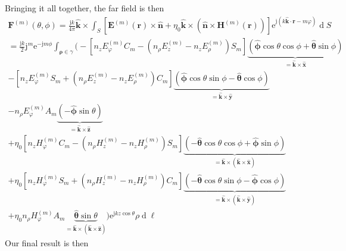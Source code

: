 \documentclass[a4paper,12pt]{article}
\renewcommand{\vec}[1]{\boldsymbol{#1}}
\newcommand{\unitvec}[1]{\hat{\vec{#1}}}
\newcommand{\mrm}[1]{\mathrm{#1}}
\newcommand{\diff}{\operatorname{d}\!}
\newcommand{\ju}{\mrm{j}}
\newcommand{\eu}{\mrm{e}}
\newcommand{\Ev}{\vec{E}}
\newcommand{\Hv}{\vec{H}}
\newcommand{\Fv}{\vec{F}}
\newcommand{\rv}{\vec{r}}
\newcommand{\xuv}{\unitvec{x}}
\newcommand{\yuv}{\unitvec{y}}
\newcommand{\zuv}{\unitvec{z}}
\newcommand{\nuv}{\unitvec{n}}
\newcommand{\kuv}{\unitvec{k}}
\newcommand{\thetauv}{\unitvec{\theta}}
\newcommand{\phiuv}{\unitvec{\phi}}
\begin{document}
Bringing it all together, the far field is then 
\begin{multline}
  \Fv^{(m)}(\theta,\phi) = \frac{\ju k}{4\pi} \kuv\times \int_{S} \left[ \Ev^{(m)}(\rv)\times\nuv + \eta_{0}\kuv\times(\nuv\times\Hv^{(m)}(\rv)) \right] \eu^{\ju(k\kuv\cdot\rv-m\varphi)} \diff S \\
  = \frac{\ju k}{2} \ju^{m}\eu^{-\ju m\phi} \int_{\vec{\rho}\in\gamma}
  \Big( - \left[ n_{z}E_{\varphi}^{(m)}C_{m}
    - (n_{\rho}E_{z}^{(m)} - n_{z}E_{\rho}^{(m)})S_{m} \right] \underbrace{(\phiuv\cos\theta\cos\phi + \thetauv\sin\phi)}_{=\kuv\times\xuv} \\
  - \left[ n_{z}E_{\varphi}^{(m)}S_{m}
    + (n_{\rho}E_{z}^{(m)} - n_{z}E_{\rho}^{(m)}) C_{m} \right] \underbrace{(\phiuv\cos\theta\sin\phi - \thetauv\cos\phi)}_{=\kuv\times\yuv} \\
  - n_{\rho}E_{\varphi}^{(m)}A_{m} \underbrace{(-\phiuv\sin\theta)}_{=\kuv\times\zuv} \\
  + \eta_{0} \left[ n_{z}H_{\varphi}^{(m)}C_{m}
    - (n_{\rho}H_{z}^{(m)} - n_{z}H_{\rho}^{(m)})S_{m} \right] \underbrace{(-\thetauv\cos\theta\cos\phi + \phiuv\sin\phi)}_{=\kuv\times(\kuv\times\xuv)} \\
  + \eta_{0}\left[n_{z}H_{\varphi}^{(m)}S_{m}
    + (n_{\rho}H_{z}^{(m)} - n_{z}H_{\rho}^{(m)})C_{m} \right] \underbrace{(-\thetauv\cos\theta\sin\phi - \phiuv\cos\phi)}_{=\kuv\times(\kuv\times\yuv)} \\
  + \eta_{0} n_{\rho}H_{\varphi}^{(m)}A_{m}
  \underbrace{\thetauv\sin\theta}_{=\kuv\times(\kuv\times\zuv)} \Big)
  \eu^{\ju kz\cos\theta} \rho\diff\ell
\end{multline}
Our final result is then
\end{document}
